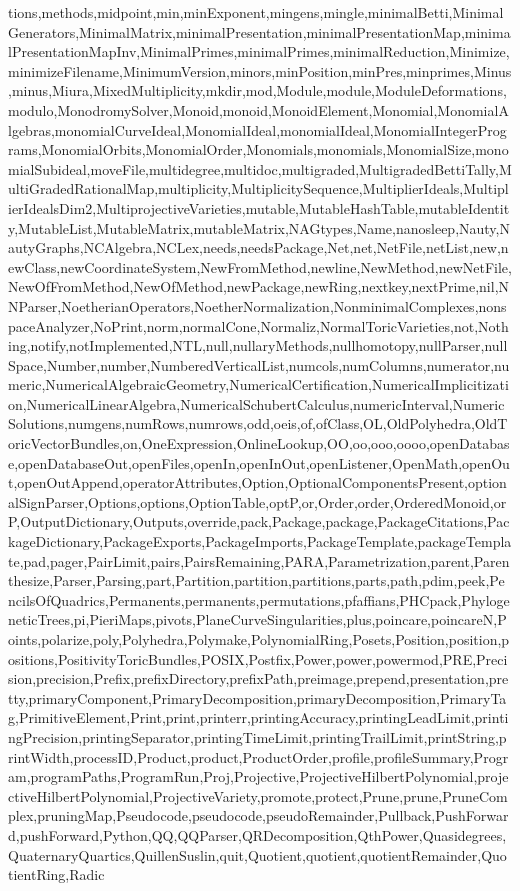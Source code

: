 {tions,methods,midpoint,min,minExponent,mingens,mingle,minimalBetti,MinimalGenerators,MinimalMatrix,minimalPresentation,minimalPresentationMap,minimalPresentationMapInv,MinimalPrimes,minimalPrimes,minimalReduction,Minimize,minimizeFilename,MinimumVersion,minors,minPosition,minPres,minprimes,Minus,minus,Miura,MixedMultiplicity,mkdir,mod,Module,module,ModuleDeformations,modulo,MonodromySolver,Monoid,monoid,MonoidElement,Monomial,MonomialAlgebras,monomialCurveIdeal,MonomialIdeal,monomialIdeal,MonomialIntegerPrograms,MonomialOrbits,MonomialOrder,Monomials,monomials,MonomialSize,monomialSubideal,moveFile,multidegree,multidoc,multigraded,MultigradedBettiTally,MultiGradedRationalMap,multiplicity,MultiplicitySequence,MultiplierIdeals,MultiplierIdealsDim2,MultiprojectiveVarieties,mutable,MutableHashTable,mutableIdentity,MutableList,MutableMatrix,mutableMatrix,NAGtypes,Name,nanosleep,Nauty,NautyGraphs,NCAlgebra,NCLex,needs,needsPackage,Net,net,NetFile,netList,new,newClass,newCoordinateSystem,NewFromMethod,newline,NewMethod,newNetFile,NewOfFromMethod,NewOfMethod,newPackage,newRing,nextkey,nextPrime,nil,NNParser,NoetherianOperators,NoetherNormalization,NonminimalComplexes,nonspaceAnalyzer,NoPrint,norm,normalCone,Normaliz,NormalToricVarieties,not,Nothing,notify,notImplemented,NTL,null,nullaryMethods,nullhomotopy,nullParser,nullSpace,Number,number,NumberedVerticalList,numcols,numColumns,numerator,numeric,NumericalAlgebraicGeometry,NumericalCertification,NumericalImplicitization,NumericalLinearAlgebra,NumericalSchubertCalculus,numericInterval,NumericSolutions,numgens,numRows,numrows,odd,oeis,of,ofClass,OL,OldPolyhedra,OldToricVectorBundles,on,OneExpression,OnlineLookup,OO,oo,ooo,oooo,openDatabase,openDatabaseOut,openFiles,openIn,openInOut,openListener,OpenMath,openOut,openOutAppend,operatorAttributes,Option,OptionalComponentsPresent,optionalSignParser,Options,options,OptionTable,optP,or,Order,order,OrderedMonoid,orP,OutputDictionary,Outputs,override,pack,Package,package,PackageCitations,PackageDictionary,PackageExports,PackageImports,PackageTemplate,packageTemplate,pad,pager,PairLimit,pairs,PairsRemaining,PARA,Parametrization,parent,Parenthesize,Parser,Parsing,part,Partition,partition,partitions,parts,path,pdim,peek,PencilsOfQuadrics,Permanents,permanents,permutations,pfaffians,PHCpack,PhylogeneticTrees,pi,PieriMaps,pivots,PlaneCurveSingularities,plus,poincare,poincareN,Points,polarize,poly,Polyhedra,Polymake,PolynomialRing,Posets,Position,position,positions,PositivityToricBundles,POSIX,Postfix,Power,power,powermod,PRE,Precision,precision,Prefix,prefixDirectory,prefixPath,preimage,prepend,presentation,pretty,primaryComponent,PrimaryDecomposition,primaryDecomposition,PrimaryTag,PrimitiveElement,Print,print,printerr,printingAccuracy,printingLeadLimit,printingPrecision,printingSeparator,printingTimeLimit,printingTrailLimit,printString,printWidth,processID,Product,product,ProductOrder,profile,profileSummary,Program,programPaths,ProgramRun,Proj,Projective,ProjectiveHilbertPolynomial,projectiveHilbertPolynomial,ProjectiveVariety,promote,protect,Prune,prune,PruneComplex,pruningMap,Pseudocode,pseudocode,pseudoRemainder,Pullback,PushForward,pushForward,Python,QQ,QQParser,QRDecomposition,QthPower,Quasidegrees,QuaternaryQuartics,QuillenSuslin,quit,Quotient,quotient,quotientRemainder,QuotientRing,Radic}
